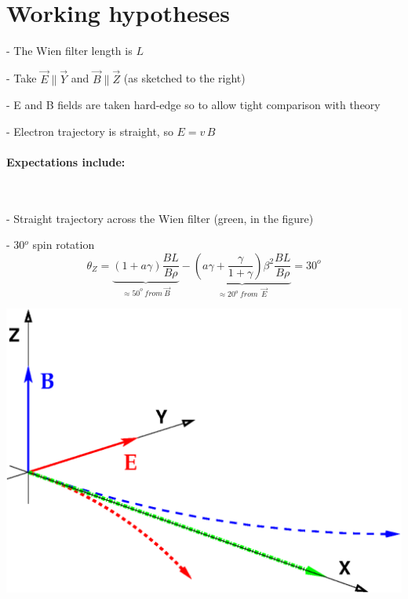 \documentclass[10pt]{article}
\newcommand{\nib}{\noindent \ensuremath{\bullet~}}
\newcommand{\nin}{\noindent~}
\begin{document}
\bigskip

\nin
\begin{minipage}{0.6\linewidth}
\section*{Working hypotheses}

- The Wien filter length is $ L$

- Take $ \vec E \parallel \vec Y$ and $ \vec B \parallel \vec Z$ (as sketched to the right)

- E and B fields are taken hard-edge so to allow tight comparison with theory

-  Electron trajectory is straight, so $ E = v \, B$



\paragraph*{Expectations include: } ~ 

- Straight trajectory across the Wien filter (green, in the figure)

- 30$^o$ spin rotation 
$$ \theta_Z =
\underbrace{ (1+a\gamma)\dfrac{BL}{B\rho}}_{\approx 50^o\ from\ \vec B} - \underbrace{ (a\gamma+\dfrac{\gamma}{1+\gamma})\beta^2 \dfrac{BL}{B\rho}}_{\approx 20^o\ from\ \ \vec E} =30^o$$

\end{minipage} \hfill
\begin{minipage}{0.39\linewidth}

  \includegraphics[width=.99\linewidth]{spinRotator.eps}
\end{minipage} 
\end{document}
